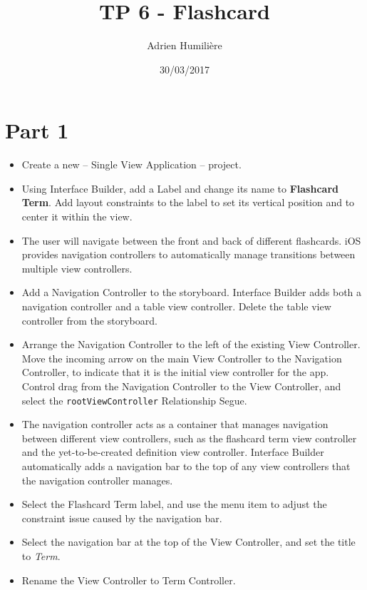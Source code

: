 \documentclass[a4paper,11pt]{scrartcl}
\begin{document}
\newcommand{\mytitle}{TP 6 - Flashcard}
\title{\mytitle}
\author{Adrien Humilière}
\date{30/03/2017}

\maketitle

\section*{Part 1}

\begin{itemize}
\item Create a new – Single View Application – project.
\item Using Interface Builder, add a Label and change its name to \textbf{Flashcard Term}. Add layout constraints to the label to set its vertical position and to center it within the view.
\item The user will navigate between the front and back of different flashcards. iOS provides navigation controllers to automatically manage transitions between multiple view controllers.
\item Add a Navigation Controller to the storyboard. Interface Builder adds both a navigation controller and a table view controller. Delete the table view controller from the storyboard.
\item Arrange the Navigation Controller to the left of the existing View Controller. Move the incoming arrow on the main View Controller to the Navigation Controller, to indicate that it is the initial view controller for the app. Control drag from the Navigation Controller to the View Controller, and select the \texttt{rootViewController} Relationship Segue.
\item The navigation controller acts as a container that manages navigation between different view controllers, such as the flashcard term view controller and the yet-to-be-created definition view controller. Interface Builder automatically adds a navigation bar to the top of any view controllers that the navigation controller manages.
\item Select the Flashcard Term label, and use the  menu item to adjust the constraint issue caused by the navigation bar.
\item Select the navigation bar at the top of the View Controller, and set the title to \textit{Term}.
\item Rename the View Controller to Term Controller.

\end{itemize}
\end{document}
